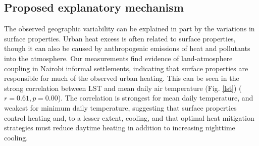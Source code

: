 \subsection{Proposed explanatory mechanism}
The observed geographic variability can be explained in part by the variations in surface properties. Urban heat excess is often related to surface properties, though it can also be caused by anthropogenic emissions of heat and pollutants into the atmosphere. Our measurements find evidence of land-atmosphere coupling in Nairobi informal settlements, indicating that surface properties are responsible for much of the observed urban heating. This can be seen in the strong correlation between LST and mean daily air temperature (Fig. \ref{lst}) ($r = 0.61, p = 0.00$). 
The correlation is strongest for mean daily temperature, and weakest for minimum daily temperature, suggesting that surface properties control heating and, to a lesser extent, cooling, and that optimal heat mitigation strategies must reduce daytime heating in addition to increasing nighttime cooling. 

